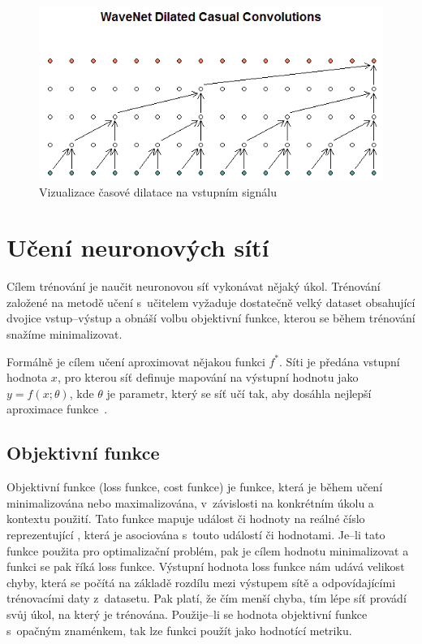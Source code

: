 \begin{figure}[H]
    \centering
    \includegraphics[scale=0.7]{obrazky-figures/causal_dilation.png}
    \caption{\label{fig:dilation_factor}Vizualizace časové dilatace na vstupním signálu}
\end{figure}


\section{Učení neuronových sítí}
Cílem trénování je naučit neuronovou síť vykonávat nějaký úkol. Trénování založené na metodě učení s~učitelem vyžaduje dostatečně velký dataset obsahující dvojice vstup--výstup a obnáší volbu objektivní funkce, kterou se během trénování snažíme minimalizovat. 

Formálně je cílem učení aproximovat nějakou funkci $f^\ast$. Síti je předána vstupní hodnota $x$, pro kterou síť definuje mapování na výstupní hodnotu jako $y = f(x; \theta)$, kde $\theta$ je parametr, který se síť učí tak, aby dosáhla nejlepší aproximace funkce~\cite{mitdeeplearning}.


\subsection{Objektivní funkce}
Objektivní funkce (loss funkce, cost funkce) je funkce, která je během učení minimalizována nebo maximalizována, v~závislosti na konkrétním úkolu a kontextu použití. Tato funkce mapuje událost či hodnoty na reálné číslo reprezentující , která je asociována s~touto událostí či hodnotami. Je--li tato funkce použita pro optimalizační problém, pak je cílem hodnotu minimalizovat a funkci se pak říká loss funkce. Výstupní hodnota loss funkce nám udává velikost chyby, která se počítá na základě rozdílu mezi výstupem sítě a odpovídajícími trénovacími daty z~datasetu. Pak platí, že čím menší chyba, tím lépe síť provádí svůj úkol, na který je trénována. Použije--li se hodnota objektivní funkce s~opačným znaménkem, tak lze funkci použít jako hodnotící metriku.


